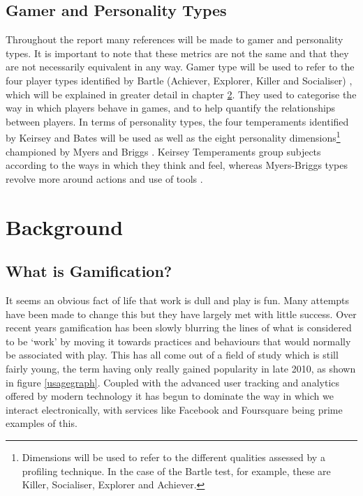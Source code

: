 \documentclass[12pt,a4paper,twoside]{report}
\begin{document}
\section{Gamer and Personality Types}
Throughout the report many references will be made to gamer and personality types. It is important to note that these metrics are not the same and that they are not necessarily equivalent in any way. Gamer type will be used to refer to the four player types identified by Bartle (Achiever, Explorer, Killer and Socialiser) \cite{bartle1996hearts}, which will be explained in greater detail in chapter \ref{sec:background}. They used to categorise the way in which players behave in games, and to help quantify the relationships between players. In terms of personality types, the four temperaments identified by Keirsey and Bates \cite{keirsey1998please} \cite{keirsey1984} will be used as well as the eight personality dimensions\footnote{Dimensions will be used to refer to the different qualities assessed by a profiling technique. In the case of the Bartle test, for example, these are Killer, Socialiser, Explorer and Achiever.} championed by Myers and Briggs \cite{myers1995gifts}. Keirsey Temperaments group subjects according to the ways in which they think and feel, whereas Myers-Briggs types revolve more around actions and use of tools \cite{keirsey1984}.

\chapter{Background}
\label{sec:background}
\section{What is Gamification?}
It seems an obvious fact of life that work is dull and play is fun. Many attempts have been made to change this but they have largely met with little success. Over recent years gamification has been slowly blurring the lines of what is considered to be `work' by moving it towards practices and behaviours that would normally be associated with play. This has all come out of a field of study which is still fairly young, the term having only really gained popularity in late 2010, as shown in figure \ref{usagegraph}. Coupled with the advanced user tracking and analytics offered by modern technology it has begun to dominate the way in which we interact electronically, with services like Facebook and Foursquare being prime examples of this.
\end{document}
